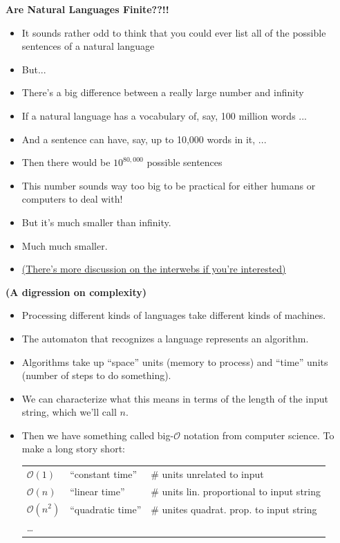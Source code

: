 \documentclass{beamer}
\newcommand{\pagestepalt}[2]{
  \begin{frame}[t]
    \begin{minipage}[t][0.26\textheight][t]{\textwidth}
      \begin{center}
        \huge
        \textbf{#1}
      \end{center}
    \end{minipage}
    
    \begin{minipage}[t][0.7\textheight][c]{\textwidth}
      #2
    \end{minipage}
  \end{frame}
}
\begin{document}
\pagestepalt{Are Natural Languages Finite??!!}{
  \vspace{-1cm}
\begin{block}{}
\begin{itemize}
	\item It sounds rather odd to think that you could ever list all of the possible sentences of a natural language
	\pause
	\item But...
	\pause
	\item There's a big difference between a really large number and infinity
	\pause
	\item {\small If a natural language has a vocabulary of, say, 100 million words ...}
	\pause
	\item And a sentence can have, say, up to 10,000 words in it, ...
	\pause
	\item Then there would be $10^{80,000}$ possible sentences
	\pause
	\item This number sounds way too big to be practical for either humans or computers to deal with!
	\pause
	\item But it's much smaller than infinity.
	\pause
	\item Much much smaller.
	\pause
	\item \tiny{\href{http://people.umass.edu/~partee/726_04/lectures/Is_Language_Infinite.pdf}{(There's more discussion on the interwebs if you're interested)}}
\end{itemize}
\end{block}
}


\pagestepalt{(A digression on complexity)}{
  \begin{block}{}
    \begin{itemize}
    \item Processing different kinds of languages take different kinds of machines.\pause
    \item The automaton that recognizes a language represents an algorithm.\pause
    \item Algorithms take up ``space'' units (memory to process) and ``time'' units (number of steps to do something).\pause
    \item We can characterize what this means in terms of the length of the input string, which we'll call $n$.\pause
    \item Then we have something called big-$\mathcal{O}$ notation from computer science. To make a long story short:
      {\footnotesize \begin{tabular}{|l|l|l|}
        \hline
        $\mathcal{O}(1)$ & ``constant time'' & \# units unrelated to input\\
        $\mathcal{O}(n)$ & ``linear time'' & \# units lin. proportional to input string\\
        $\mathcal{O}(n^2)$ & ``quadratic time'' & {\# unites quadrat. \newline prop. to input string} \\
        \ldots &&\\
        \hline 
      \end{tabular} }
    \end{itemize}
  \end{block}
}
\end{document}
